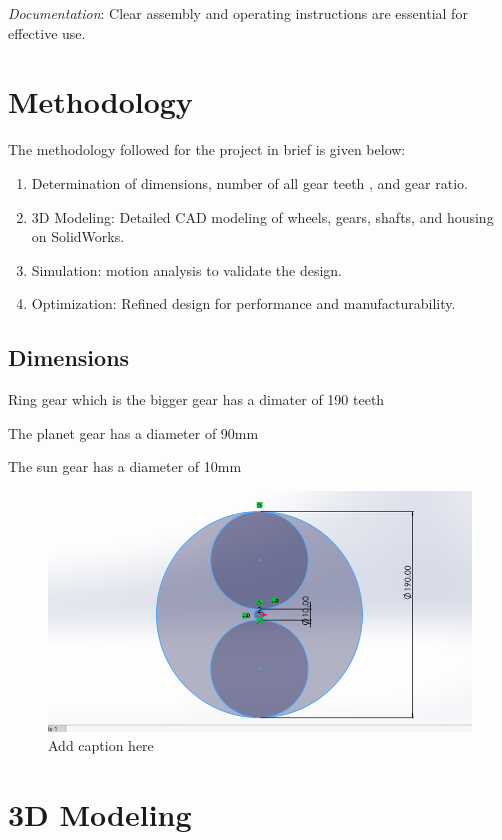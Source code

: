 \documentclass[../../main]{subfiles}
\begin{document}
\emph{Documentation}: Clear assembly and operating instructions are
essential for effective use.

\section{Methodology}

The methodology followed for the project in brief is given below:

\begin{enumerate}
\def\labelenumi{\arabic{enumi}.}
\item
  Determination of dimensions, number of all gear teeth , and gear
  ratio.
\item
  3D Modeling: Detailed CAD modeling of wheels, gears, shafts, and
  housing on SolidWorks.
\item
  Simulation: motion analysis to validate the design.
\item
  Optimization: Refined design for performance and manufacturability.
\end{enumerate}

\subsection{Dimensions}

Ring gear which is the bigger gear has a dimater of 190 teeth

The planet gear has a diameter of 90mm

The sun gear has a diameter of 10mm
\begin{figure}[h]
  \centering
\includegraphics[width=\textwidth]{sublatex/Opryrmi/media/image1.png}
\caption{Add caption here}
\end{figure}

\newpage
\section{3D Modeling}
\end{document}
